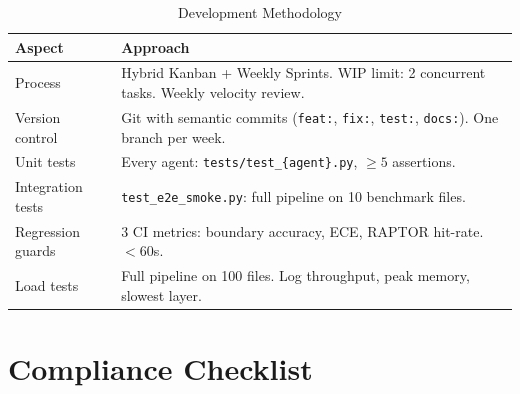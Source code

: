 \documentclass[11pt,a4paper]{article}
\begin{document}
\begin{table}[H]
\centering
\caption{Development Methodology}
\renewcommand{\arraystretch}{1.3}
\begin{tabularx}{\textwidth}{@{} l X @{}}
\toprule
\textbf{Aspect} & \textbf{Approach} \\
\midrule
Process & Hybrid Kanban + Weekly Sprints. WIP limit: 2 concurrent tasks. Weekly velocity review. \\
Version control & Git with semantic commits (\texttt{feat:}, \texttt{fix:}, \texttt{test:}, \texttt{docs:}). One branch per week. \\
Unit tests & Every agent: \texttt{tests/test\_\{agent\}.py}, $\geq 5$ assertions. \\
Integration tests & \texttt{test\_e2e\_smoke.py}: full pipeline on 10 benchmark files. \\
Regression guards & 3 CI metrics: boundary accuracy, ECE, RAPTOR hit-rate. $< 60$s. \\
Load tests & Full pipeline on 100 files. Log throughput, peak memory, slowest layer. \\
\bottomrule
\end{tabularx}
\end{table}


\section{Compliance Checklist}
\end{document}
